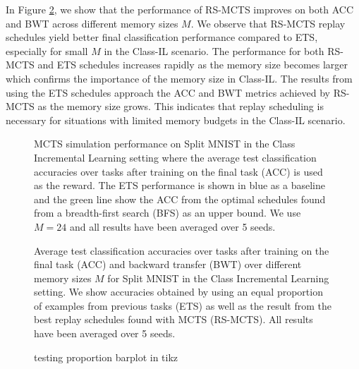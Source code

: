 In Figure \ref{fig:MNIST_ACC_BWT_over_M_class_il_appendix}, we show that the performance of RS-MCTS improves on both ACC and BWT across  different  memory sizes $M$. We observe that RS-MCTS replay schedules yield better final classification performance compared to ETS, especially for small $M$ in the Class-IL scenario. The performance for both RS-MCTS and ETS schedules increases rapidly as the memory size becomes larger which confirms the importance of the memory size in Class-IL. The results from using the ETS schedules approach the ACC and BWT metrics achieved by RS-MCTS as the memory size grows. This indicates that replay scheduling is necessary for situations with limited memory budgets in the Class-IL scenario. 

\begin{figure}[h]
  \centering
  \setlength{\figwidth}{0.9\columnwidth}
  \setlength{\figheight}{0.3\textwidth}
  
  \caption{MCTS simulation performance on Split MNIST in the Class Incremental Learning setting where the average test classification accuracies over tasks after training on the final task (ACC) is used as the reward. The ETS performance is shown in blue as a baseline and the green line show the ACC from the optimal schedules found from a breadth-first search (BFS) as an upper bound. We use $M= 24$ and all results have been averaged over 5 seeds.
  }\vspace{-12pt}
  \label{fig:MNIST_mcts_best_rewards_M24_class_il_appendix}
\end{figure}

\begin{figure}[h]
  \centering
  \setlength{\figwidth}{0.85\columnwidth}
  \setlength{\figheight}{0.3\textwidth}
  
  \caption{Average test classification accuracies over tasks after training on the final task (ACC) and backward transfer (BWT) over different memory sizes $M$ for Split MNIST in the Class Incremental Learning setting. We show accuracies obtained by using an equal proportion of examples from previous tasks (ETS) as well as the result from the best replay schedules found with MCTS (RS-MCTS). All results have been averaged over 5 seeds.
  }\vspace{-12pt}
  \label{fig:MNIST_ACC_BWT_over_M_class_il_appendix}
\end{figure}


\begin{figure}[t]
\centering
\setlength{\figwidth}{0.95\columnwidth}
\setlength{\figheight}{.3\textheight}

\caption{testing proportion barplot in tikz }
\label{fig:testing_proportion_barplot}
\end{figure}